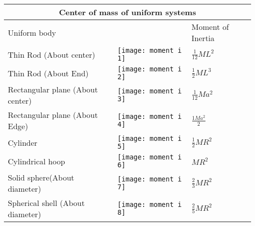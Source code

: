 \begin{table}[H]
	\centering
	\renewcommand*{\arraystretch}{1.5}
	\begin{tabular}{|p{4cm}|p{6cm}|p{3cm}|}
		\hline
		\multicolumn{3}{|c|}{\textbf{Center of mass of uniform systems}}\\\hline\hline
		\rowcolor{ocrel}Uniform body& & Moment of Inertia\\\hline
		Thin Rod (About center)&
		\texttt{[image: moment i 1]}
		&\textbf{$\frac{1}{12}ML^{2}$}   \\\hline 
		Thin Rod (About End)& 			\texttt{[image: moment i 2]} & \textbf{$\frac{1}{2}ML^{3}$}   \\\hline 
		Rectangular plane (About center)& \texttt{[image:  moment i 3]} &\textbf{$\frac{1}{12}Ma^{2}$}   \\\hline 
		Rectangular plane (About Edge)&	\texttt{[image:  moment i 4]} & \textbf{$\frac{1Ma^{2}}{2}$}   \\\hline 
		Cylinder& \texttt{[image: moment i 5]} &\textbf{$\frac{1}{2}MR^{2}$}   \\\hline
		Cylindrical hoop& \texttt{[image: moment i 6]} &\textbf{$MR^{2}$}   \\\hline
		Solid sphere(About diameter)& \texttt{[image: moment i 7]} &\textbf{$\frac{2}{3}MR^{2}$}   \\\hline
		Spherical shell (About diameter)& \texttt{[image: moment i 8]} &\textbf{$\frac{2}{5} MR^{2}$}   \\\hline
	\end{tabular}
\end{table}


